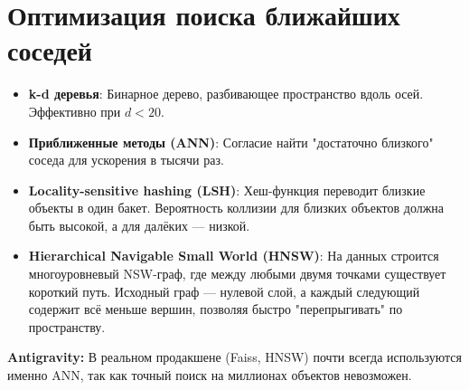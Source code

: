 \documentclass[12pt]{article}
\newcommand{\antigravity}[1]{{\small\color{antigravityblue}\textbf{Antigravity:} #1}}
\begin{document}
\section{Оптимизация поиска ближайших соседей}

\begin{itemize}
    \item \textbf{k-d деревья}: Бинарное дерево, разбивающее пространство вдоль осей. Эффективно при $d < 20$.
    \item \textbf{Приближенные методы (ANN)}: Согласие найти "достаточно близкого" соседа для ускорения в тысячи раз.
    \item \textbf{Locality-sensitive hashing (LSH)}: Хеш-функция переводит близкие объекты в один бакет. Вероятность коллизии для близких объектов должна быть высокой, а для далёких — низкой.
    \item \textbf{Hierarchical Navigable Small World (HNSW)}: На данных строится многоуровневый NSW-граф, где между любыми двумя точками существует короткий путь. Исходный граф — нулевой слой, а каждый следующий содержит всё меньше вершин, позволяя быстро "перепрыгивать" по пространству.
\end{itemize}

\antigravity{В реальном продакшене (Faiss, HNSW) почти всегда используются именно ANN, так как точный поиск на миллионах объектов невозможен.}
\end{document}
